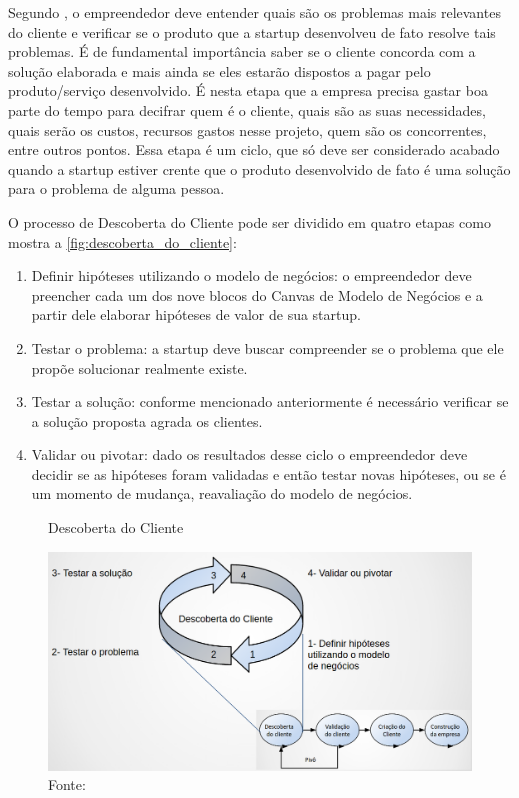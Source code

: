 Segundo , o empreendedor deve entender quais são os problemas mais relevantes do cliente e verificar se o produto que a startup desenvolveu de fato resolve tais problemas. É de fundamental importância saber se o cliente concorda com a solução elaborada e mais ainda se eles estarão dispostos a pagar pelo produto/serviço desenvolvido. É nesta etapa que a empresa precisa gastar boa parte do tempo para decifrar quem é o cliente, quais são as suas necessidades, quais serão os custos, recursos gastos nesse projeto, quem são os concorrentes, entre outros pontos. Essa etapa é um ciclo, que só deve ser considerado acabado quando a startup estiver crente que o produto desenvolvido de fato é uma solução para o problema de alguma pessoa.

O processo de Descoberta do Cliente pode ser dividido em quatro etapas como mostra a \autoref{fig:descoberta_do_cliente}:
\begin{enumerate}
\item Definir hipóteses utilizando o modelo de negócios: o empreendedor deve preencher cada um dos nove blocos do Canvas de Modelo de Negócios e a partir dele elaborar hipóteses de valor de sua startup.
\item Testar o problema: a startup deve buscar compreender se o problema que ele propõe solucionar realmente existe.
\item Testar a solução: conforme mencionado anteriormente é necessário verificar se a solução proposta agrada os clientes.
\item Validar ou pivotar: dado os resultados desse ciclo o empreendedor deve decidir se as hipóteses foram validadas e então testar novas hipóteses, ou se é um momento de mudança, reavaliação do modelo de negócios.
\end{enumerate}

\begin{figure}[H]
\caption{Descoberta do Cliente}
\centerline{\includegraphics[scale=0.3]{img/descoberta_do_cliente}}
\label{fig:descoberta_do_cliente}
\caption* {Fonte: }
\end{figure}

